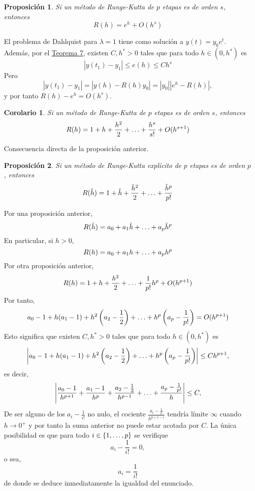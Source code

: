 \documentclass[11pt]{report}
\makeatletter
\renewenvironment{proof}[1][\proofname]{\par
  \pushQED{\qed}%
  \normalfont \topsep\z@skip %
  \trivlist
  \item[\hskip\labelsep
        \itshape
    #1\@addpunct{.}]\ignorespaces
}{%
  \popQED\endtrivlist\@endpefalse
}
\theoremstyle{mytheorem}
\newtheorem{proposition}{Proposición}
\newtheorem{corollary}{Corolario} %
\theoremstyle{mydefinition}
\theoremstyle{myexample}
\let\oldproofname=\proofname
\renewcommand{\proofname}{\rm\bf{\oldproofname}}}
\newenvironment{cproposition} %
  {\begin{mdframed}[
        linewidth=3pt,
        linecolor=c2,
        bottomline=false,
        topline=false,
        rightline=false,
        innerrightmargin=0pt,
        innertopmargin=0pt,
        innerbottommargin=0pt,
        innerleftmargin=1em, %
        skipabove=\baselineskip]
    \begin{proposition}}
  {\end{proposition}\end{mdframed}}
\newenvironment{ccorollary} %
  {\begin{mdframed}[
        linewidth=3pt,
        linecolor=c2,
        bottomline=false,
        topline=false,
        rightline=false,
        innerrightmargin=0pt,
        innertopmargin=0pt,
        innerbottommargin=0pt,
        innerleftmargin=1em, %
        skipabove=\baselineskip]
    \begin{corollary}}
  {\end{corollary}\end{mdframed}}
\makeatother
\begin{document}
\begin{cproposition}
    Si un método de Runge-Kutta de $p$ etapas es de orden $s$, entonces 
    \[R(h) =e^h+O(h^{s})\]
\end{cproposition}

\begin{proof}
    El problema de Dahlquist para $\lambda = 1$ tiene como solución a $y(t) = y_0e^t$. Además, por el \hyperref[teo7]{\color{gray}Teorema 7}, existen $C,h^*>0$ tales que para todo $h \in (0,h^*)$ es
    \[|y(t_1)-y_1| \leq e(h) \leq Ch^s\]
    Pero
    \[|y(t_1) -y_1| = |y(h)-R(h)y_0| = |y_0||e^h-R(h)|,\]
    y por tanto $R(h)-e^h = O(h^s)$.
\end{proof}

\begin{ccorollary}
    Si un método de Runge-Kutta de $p$ etapas es de orden $s$, entonces
    \[R(h) = 1+h+\frac{h^2}{2}+\mathellipsis+\frac{h^s}{s!}+O(h^{s+1})\]
\end{ccorollary}

\begin{proof}
    Consecuencia directa de la proposición anterior.
\end{proof}

\begin{cproposition}
    Si un método de Runge-Kutta explícito de $p$ etapas es de orden $p$, entonces
    \[R(\hat{h}) = 1+\hat{h}+\frac{\hat{h}^2}{2}+\mathellipsis+\frac{\hat{h}^p}{p!}\]
\end{cproposition}

\begin{proof}
    Por una proposición anterior,
    \[R(\hat{h}) = a_0+a_1\hat{h}+\mathellipsis+a_p\hat{h}^p\]
    En particular, si $h >0$,
    \[R(h) = a_0+a_1h+\mathellipsis+a_ph^p\]
    Por otra proposición anterior,
    \[R(h) = 1+h+\frac{h^2}{2}+\mathellipsis+\frac{1}{p!}h^p+O(h^{p+1})\]
    Por tanto,
    \[a_0-1+h(a_1-1)+h^2\left(a_2-\frac{1}{2}\right)+\mathellipsis+h^p\left(a_p-\frac{1}{p!}\right) = O(h^{p+1})\]
    Esto significa que existen $C,h^*>0$ tales que para todo $h \in (0,h^*)$ es
    \[\left|a_0-1+h(a_1-1)+h^2\left(a_2-\frac{1}{2}\right)+\mathellipsis+h^p\left(a_p-\frac{1}{p!}\right) \right| \leq Ch^{p+1},\]
    es decir,
    \[\left|\frac{a_0-1}{h^{p+1}}+\frac{a_1-1}{h^p}+\frac{a_2-\frac{1}{2}}{h^{p-1}}+\mathellipsis+\frac{a_p-\frac{1}{p!}}{h} \right| \leq C,\]
    De ser alguno de los $a_i-\frac{1}{i!}$ no nulo, el cociente $\frac{a_i-\frac{1}{i!}}{h^{p+1-i}}$ tendría límite $\infty$ cuando $h \to 0^+$ y por tanto la suma anterior no puede estar acotada por $C$. La única posibilidad es que para todo $i \in \{1,\mathellipsis,p\}$ se verifique
    \[a_i-\frac{1}{i!} = 0,\]
    o sea,
    \[a_i = \frac{1}{i!}\]
    de donde se deduce inmediatamente la igualdad del enunciado.
\end{proof}
\end{document}
